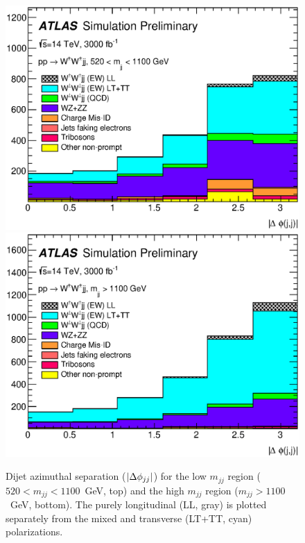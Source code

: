 \begin{figure}[htbp]
  \centering
  \includegraphics[width=.8\textwidth]{figs/ssww_upgrade/results/plots_optimisedLL_all_pass9_dijet_absdphijj_lowmjj}\\
  \includegraphics[width=.8\textwidth]{figs/ssww_upgrade/results/plots_optimisedLL_all_pass9_dijet_absdphijj_highmjj}
  \caption{Dijet azimuthal separation ($|\Delta\phi_{jj}|$) for the low $m_{jj}$ region ($520 < m_{jj} < 1100$~GeV, top) and the high $m_{jj}$ region ($m_{jj} > 1100$~GeV, bottom).  The purely longitudinal (LL, gray) is plotted separately from the mixed and transverse (LT+TT, cyan) polarizations.}
  \label{fig:sswwupgrade_dphijj_LL}
\end{figure}

